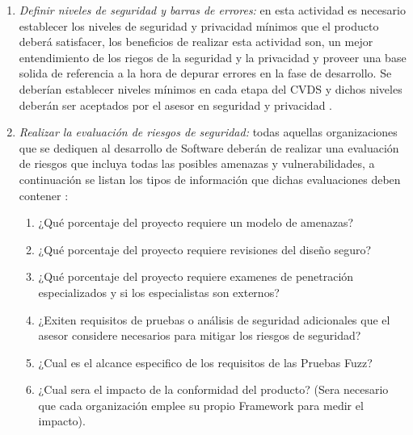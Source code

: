 \documentclass[runningheads,a4paper]{llncs}
\begin{document}
\begin{enumerate}
\begin{enumerate}
\item \textit{Definir niveles de seguridad y barras de errores: }en esta actividad es necesario establecer los niveles de seguridad y privacidad mínimos que el producto deberá satisfacer, los beneficios de realizar esta actividad son, un mejor entendimiento de los riegos de la seguridad y la privacidad y proveer una base solida de referencia a la hora de depurar errores en la fase de desarrollo. Se deberían establecer niveles mínimos en cada etapa del \gls{CVDS} y dichos niveles deberán ser aceptados por el asesor en seguridad y privacidad \cite{SDLWhitePaper}. \\

\item \textit{Realizar la evaluación de riesgos de seguridad: }todas aquellas organizaciones que se dediquen al desarrollo de Software deberán de realizar una evaluación de riesgos que incluya todas las posibles amenazas y vulnerabilidades, a continuación se listan los tipos de información que dichas evaluaciones deben contener \cite{SDLWhitePaper}: \\
		
\begin{enumerate}
	\item ¿Qué porcentaje del proyecto requiere un modelo de amenazas?
	\item ¿Qué porcentaje del proyecto requiere revisiones del diseño seguro?
	\item ¿Qué porcentaje del proyecto requiere examenes de penetración especializados y si los especialistas son externos?
	\item ¿Exiten requisitos de pruebas o análisis de seguridad adicionales que el asesor considere necesarios para mitigar los riesgos de seguridad?
	\item ¿Cual es el alcance especifico de los requisitos de las \gls{Pruebas Fuzz}?
	\item ¿Cual sera el impacto de la conformidad del producto? (Sera necesario que cada organización emplee su propio \gls{Framework} para medir el impacto).\\
	

\end{enumerate}
\end{enumerate}
\end{enumerate}
\end{document}
